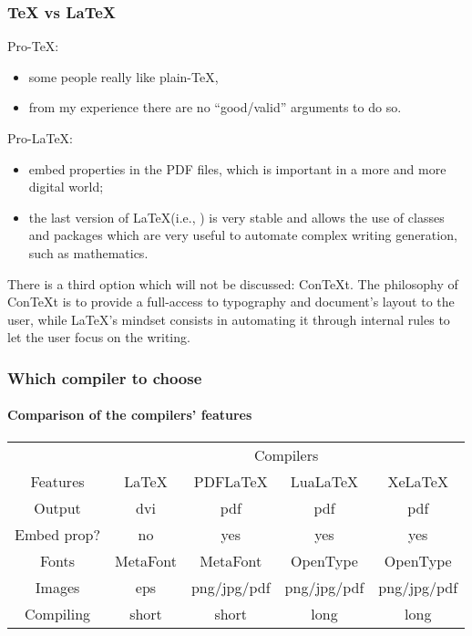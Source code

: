 \documentclass[11pt]{beamer}
\begin{document}
\begin{frame}
	\frametitle{\TeX{} vs \LaTeX{}}
	
	Pro-\TeX{}:
	\begin{itemize}
		\item some people really like plain-\TeX{},
		\item from my experience there are no \enquote{good/valid} arguments to do so.
	\end{itemize}

	Pro-\LaTeX{}:
	\begin{itemize}
		\item embed properties in the PDF files, which is important in a more and more digital world;
		\item the last version of \LaTeX (i.e., \LaTeXe{}) is very stable and allows the use of classes and packages which are very useful to automate complex writing generation, such as mathematics.
	\end{itemize}

	There is a third option which will not be discussed: ConTeXt. The philosophy of ConTeXt is to provide a full-access to typography and document's layout to the user, while \LaTeX{}'s mindset consists in automating it through internal rules to let the user focus on the writing.
\end{frame}


\begin{frame}
	\frametitle{Which compiler to choose}
	\framesubtitle{Comparison of the compilers' features}
	
	\begin{table}
		\begin{tabular}{*{5}{c}} \toprule
			&\multicolumn{4}{c}{Compilers} \\ \cmidrule(l){2-5}
			Features	& LaTeX		& PDFLaTeX	& LuaLaTeX	& XeLaTeX	\\ \midrule
			Output		& dvi		& pdf   	& pdf   	& pdf   	\\ 
			Embed prop?	& no		& yes		& yes		& yes 		\\ 
			Fonts   	& MetaFont	& MetaFont	& OpenType	& OpenType 	\\
			Images		& eps		& png/jpg/pdf & png/jpg/pdf & png/jpg/pdf \\
			Compiling	& short		& short		& long		& long		\\ \bottomrule
		\end{tabular}
	\end{table}
\end{frame}
\end{document}
